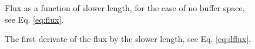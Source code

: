 \documentclass[10pt,a4paper]{article}
\begin{document}
\begin{figure}[ht]
\centering
{}
\caption{Flux as a function of slower length, for the case of no buffer space, see Eq. \ref{eq:flux}.}
\label{fig:flux}
\end{figure}


\begin{figure}[ht]
\centering
{}
\caption{The first derivate of the flux by the slower length, see Eq. \ref{eq:dflux}.}
\label{fig:dflux}
\end{figure}
\end{document}
